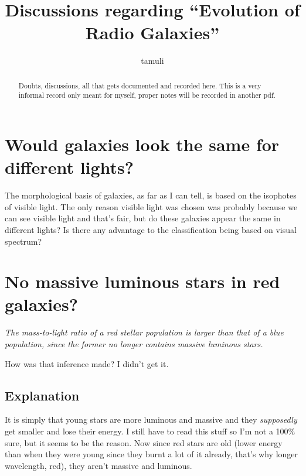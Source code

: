 \documentclass[a4paper,12pt]{article}
\title{Discussions regarding ``Evolution of Radio Galaxies''}
\author{tamuli}
\date{}
\newcommand{\ti}[1]{\textit{#1}}
\begin{document}
\maketitle

\begin{abstract}
  Doubts, discussions, all that gets documented and recorded here. This is a very informal record only meant for myself, proper notes will be recorded in another pdf.
\end{abstract}

\tableofcontents

\newpage

\section{Would galaxies look the same for different lights?}
The morphological basis of galaxies, as far as I can tell, is based on the isophotes of visible light. The only reason visible light was chosen was probably because we can see visible light and that's fair, but do these galaxies appear the same in different lights? Is there any advantage to the classification being based on visual spectrum?


\section{No massive luminous stars in red galaxies?}

\ti{The mass-to-light ratio of a red stellar population is larger than that of a blue population, since the former no longer contains massive luminous stars.}

\vspace{1em}

How was that inference made? I didn't get it.

\subsection*{Explanation}
It is simply that young stars are more luminous and massive and they \ti{supposedly} get smaller and lose their energy. I still have to read this stuff so I'm not a 100\% sure, but it seems to be the reason. Now since red stars are old (lower energy than when they were young since they burnt a lot of it already, that's why longer wavelength, red), they aren't massive and luminous.
\end{document}
